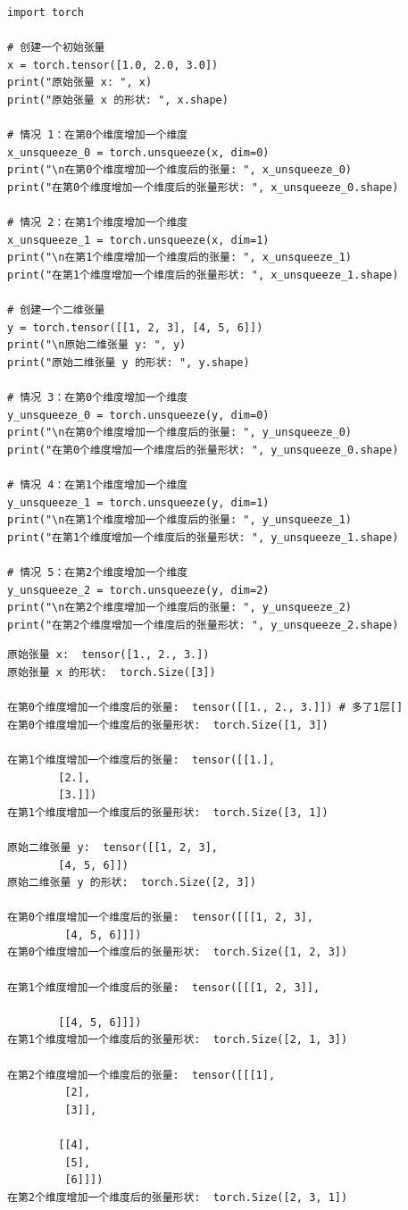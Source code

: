 \begin{lstlisting}[style=pythonstyle]
import torch

# 创建一个初始张量
x = torch.tensor([1.0, 2.0, 3.0])
print("原始张量 x: ", x)
print("原始张量 x 的形状: ", x.shape)

# 情况 1：在第0个维度增加一个维度
x_unsqueeze_0 = torch.unsqueeze(x, dim=0)
print("\n在第0个维度增加一个维度后的张量: ", x_unsqueeze_0)
print("在第0个维度增加一个维度后的张量形状: ", x_unsqueeze_0.shape)

# 情况 2：在第1个维度增加一个维度
x_unsqueeze_1 = torch.unsqueeze(x, dim=1)
print("\n在第1个维度增加一个维度后的张量: ", x_unsqueeze_1)
print("在第1个维度增加一个维度后的张量形状: ", x_unsqueeze_1.shape)

# 创建一个二维张量
y = torch.tensor([[1, 2, 3], [4, 5, 6]])
print("\n原始二维张量 y: ", y)
print("原始二维张量 y 的形状: ", y.shape)

# 情况 3：在第0个维度增加一个维度
y_unsqueeze_0 = torch.unsqueeze(y, dim=0)
print("\n在第0个维度增加一个维度后的张量: ", y_unsqueeze_0)
print("在第0个维度增加一个维度后的张量形状: ", y_unsqueeze_0.shape)

# 情况 4：在第1个维度增加一个维度
y_unsqueeze_1 = torch.unsqueeze(y, dim=1)
print("\n在第1个维度增加一个维度后的张量: ", y_unsqueeze_1)
print("在第1个维度增加一个维度后的张量形状: ", y_unsqueeze_1.shape)

# 情况 5：在第2个维度增加一个维度
y_unsqueeze_2 = torch.unsqueeze(y, dim=2)
print("\n在第2个维度增加一个维度后的张量: ", y_unsqueeze_2)
print("在第2个维度增加一个维度后的张量形状: ", y_unsqueeze_2.shape)
\end{lstlisting}
\begin{lstlisting}[style=demostyle,numbers=none]
原始张量 x:  tensor([1., 2., 3.])
原始张量 x 的形状:  torch.Size([3])

在第0个维度增加一个维度后的张量:  tensor([[1., 2., 3.]]) # 多了1层[]
在第0个维度增加一个维度后的张量形状:  torch.Size([1, 3])

在第1个维度增加一个维度后的张量:  tensor([[1.],
        [2.],
        [3.]])
在第1个维度增加一个维度后的张量形状:  torch.Size([3, 1])

原始二维张量 y:  tensor([[1, 2, 3],
        [4, 5, 6]])
原始二维张量 y 的形状:  torch.Size([2, 3])

在第0个维度增加一个维度后的张量:  tensor([[[1, 2, 3],
         [4, 5, 6]]])
在第0个维度增加一个维度后的张量形状:  torch.Size([1, 2, 3])

在第1个维度增加一个维度后的张量:  tensor([[[1, 2, 3]],

        [[4, 5, 6]]])
在第1个维度增加一个维度后的张量形状:  torch.Size([2, 1, 3])

在第2个维度增加一个维度后的张量:  tensor([[[1],
         [2],
         [3]],

        [[4],
         [5],
         [6]]])
在第2个维度增加一个维度后的张量形状:  torch.Size([2, 3, 1])
\end{lstlisting}

